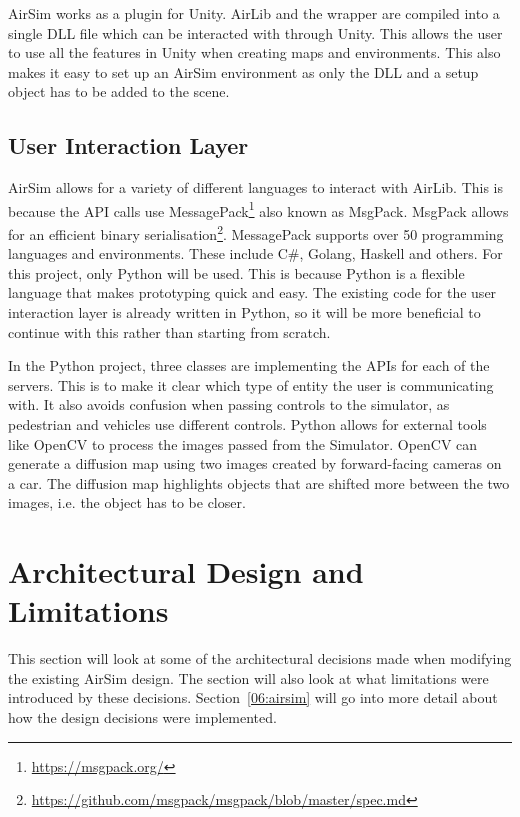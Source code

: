 AirSim works as a plugin for Unity. AirLib and the wrapper are compiled into a single DLL file which can be interacted with through Unity. This allows the user to use all the features in Unity when creating maps and environments. This also makes it easy to set up an AirSim environment as only the DLL and a setup object has to be added to the scene.  


\subsection{User Interaction Layer} \label{05:UIL}
AirSim allows for a variety of different languages to interact with AirLib. This is because the API calls use MessagePack\footnote{\url{https://msgpack.org/}} also known as MsgPack. MsgPack allows for an efficient binary serialisation\footnote{\url{https://github.com/msgpack/msgpack/blob/master/spec.md}}. MessagePack supports over 50 programming languages and environments. These include C\#, Golang, Haskell and others.  For this project, only Python will be used. This is because Python is a flexible language that makes prototyping quick and easy. The existing code for the user interaction layer is already written in Python, so it will be more beneficial to continue with this rather than starting from scratch.

In the Python project, three classes are implementing the APIs for each of the servers. This is to make it clear which type of entity the user is communicating with. It also avoids confusion when passing controls to the simulator, as pedestrian and vehicles use different controls. Python allows for external tools like OpenCV to process the images passed from the Simulator. OpenCV can generate a diffusion map using two images created by forward-facing cameras on a car. The diffusion map highlights objects that are shifted more between the two images, i.e. the object has to be closer. 


\section{Architectural Design and Limitations} \label{05:ArchitecturalDesign}
This section will look at some of the architectural decisions made when modifying the existing AirSim design. The section will also look at what limitations were introduced by these decisions. Section~\ref{06:airsim} will go into more detail about how the design decisions were implemented. 


